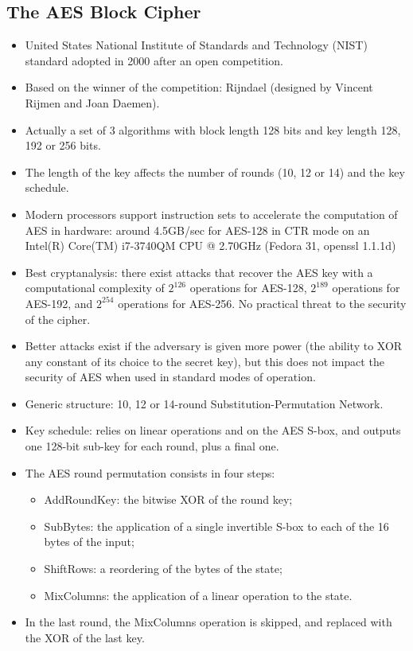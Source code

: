 	\subsection{The AES Block Cipher}
		\begin{itemize}
			\item United States National Institute of Standards and Technology (NIST) standard adopted in 2000 after an open competition.
			\item Based on the winner of the competition: Rijndael (designed by Vincent Rijmen and Joan Daemen).
			\item Actually a set of 3 algorithms with block length 128 bits and key length 128, 192 or 256 bits.
			\item The length of the key affects the number of rounds (10, 12 or 14) and the key schedule.
			\item Modern processors support instruction sets to accelerate the computation of AES in hardware: around 4.5GB/sec for AES-128 in CTR mode 
			on an Intel(R) Core(TM) i7-3740QM CPU @ 2.70GHz (Fedora 31, openssl 1.1.1d)
			\item Best cryptanalysis: there exist attacks that recover the AES key with a computational complexity of $2^{126}$ operations for AES-128, 
			$2^{189}$ operations for AES-192, and $2^{254}$ operations for AES-256.
			No practical threat to the security of the cipher.
			\item Better attacks exist if the adversary is given more power (the ability to XOR any constant of its choice to the secret key), 
			but this does not impact the security of AES when used in standard modes of operation.
			\item Generic structure: 10, 12 or 14-round Substitution-Permutation Network.
			\item Key schedule: relies on linear operations and on the AES S-box, and outputs one 128-bit sub-key for each round, plus a final one.
			\item The AES round permutation consists in four steps:
			\begin{itemize}
				\item AddRoundKey: the bitwise XOR of the round key;
				\item SubBytes: the application of a single invertible S-box to each of the 16 bytes of the input;
				\item ShiftRows: a reordering of the bytes of the state;
				\item MixColumns: the application of a linear operation to the state.
			\end{itemize}
			\item In the last round, the MixColumns operation is skipped, and replaced with the XOR of the last key.
		\end{itemize}
